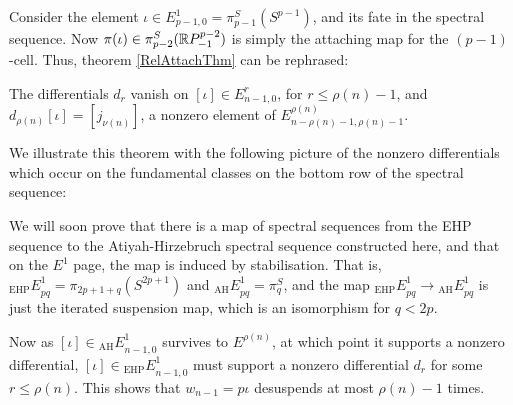Consider the element $\iota\in E^1_{p-1,0}=\pi^S_{p-1}(S^{p-1})$, and its fate in the spectral sequence. Now $\pi(\iota)\in \pi^S_{p-2}(\mathbb{R} P^{p-2}_{-1})$ is simply the attaching map for the $(p-1)$-cell. Thus, theorem \ref{RelAttachThm} can be rephrased:
\begin{thm}
The differentials $d_r$ vanish on $[\iota]\in E_{n-1,0}^r$, for $r\leq\rho(n)-1$, and $d_{\rho(n)}[\iota]=[j_{\nu(n)}]$, a nonzero element of $E^{\rho(n)}_{n-\rho(n)-1,\rho(n)-1}$.
\end{thm}
We illustrate this theorem with the following picture of the nonzero differentials which occur on the fundamental classes on the bottom row of the spectral sequence:
\begin{center}
\end{center}

We will soon prove that there is a map of spectral sequences from the EHP sequence to the Atiyah-Hirzebruch spectral sequence constructed here, and that on the $E^1$ page, the map is induced by stabilisation. That is, ${_\text{EHP}E}^1_{pq}=\pi_{2p+1+q}(S^{2p+1})$ and ${_\text{AH}E}^1_{pq}=\pi^S_q$, and the map ${_\text{EHP}E}^1_{pq}\to{_\text{AH}E}^1_{pq}$ is just the iterated suspension map, which is an isomorphism for $q<2p$.

Now as $[\iota]\in {_\text{AH}E}^1_{n-1,0}$ survives to $E^{\rho(n)}$, at which point it supports a nonzero differential, $[\iota]\in {_\text{EHP}E}^1_{n-1,0}$ must support a nonzero differential $d_r$ for some $r\leq\rho(n)$. This shows that $w_{n-1}=p\iota$ desuspends at most $\rho(n)-1$ times.

